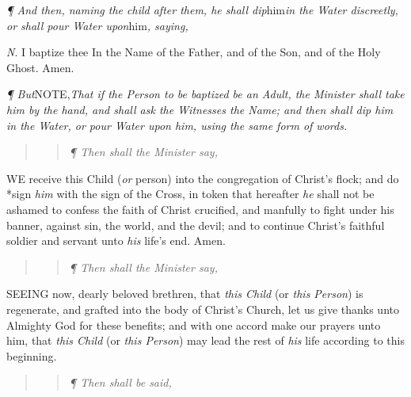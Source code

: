 \emph{¶
And then, naming the child after them, he shall dip}him\emph{in the
Water discreetly, or shall pour Water upon}him\emph{, saying,}

\emph{N}.
I baptize thee In the Name of the Father, and of the Son, and of the Holy
Ghost. Amen.

\emph{¶
But}NOTE,\emph{That if the Person to be baptized
be an Adult, the Minister shall take him by the hand, and shall ask
the Witnesses the Name; and then shall dip him in the Water, or pour
Water upon him, using the same form of words.}

\begin{quote}

\begin{quote}

\emph{¶
Then shall the Minister say,}

\end{quote}

\end{quote}

WE
receive this Child
(\emph{or} person) into the congregation of Christ’s flock; and
do *sign \emph{him} with the sign of the Cross, in token that hereafter
\emph{he} shall not be ashamed to confess the faith of Christ crucified,
and manfully to fight under his banner, against sin, the world, and the
devil; and to continue Christ’s faithful soldier and servant unto
\emph{his} life’s end. Amen.

\begin{quote}

\begin{quote}

\emph{¶ Then shall the Minister say,}

\end{quote}

\end{quote}

SEEING
now, dearly beloved brethren, that \emph{this Child} (or \emph{this Person})
is regenerate, and grafted into the body of Christ’s Church, let
us give thanks unto Almighty God for these benefits; and with one accord
make our prayers unto him, that \emph{this Child} (or \emph{this Person})
may lead the rest of \emph{his} life according to this beginning.

\begin{quote}

\begin{quote}

\emph{¶
Then shall be said,}

\end{quote}

\end{quote}

